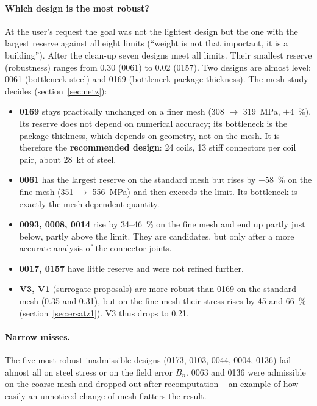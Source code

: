 \paragraph{Which design is the most robust?} At the user's request the goal was not the lightest design but the one
with the largest reserve against all eight limits (``weight is not that important, it is a building''). After the
clean-up seven designs meet all limits. Their smallest reserve (robustness) ranges from 0.30 (0061) to 0.02 (0157).
Two designs are almost level: 0061 (bottleneck steel) and 0169 (bottleneck package thickness). The mesh study
decides (section~\ref{sec:netz}):

\begin{itemize}
\item \textbf{0169} stays practically unchanged on a finer mesh (\SI{308}{} $\to$ \SI{319}{MPa}, $+4$~\%). Its
  reserve does not depend on numerical accuracy; its bottleneck is the package thickness, which depends on
  geometry, not on the mesh. It is therefore the \textbf{recommended design}: 24 coils, 13 stiff connectors per
  coil pair, about \SI{28}{kt} of steel.
\item \textbf{0061} has the largest reserve on the standard mesh but rises by $+58$~\% on the fine mesh
  (\SI{351}{} $\to$ \SI{556}{MPa}) and then exceeds the limit. Its bottleneck is exactly the mesh-dependent
  quantity.
\item \textbf{0093, 0008, 0014} rise by 34--46~\% on the fine mesh and end up partly just below, partly above the
  limit. They are candidates, but only after a more accurate analysis of the connector joints.
\item \textbf{0017, 0157} have little reserve and were not refined further.
\item \textbf{V3, V1} (surrogate proposals) are more robust than 0169 on the standard mesh (0.35 and 0.31), but on
  the fine mesh their stress rises by 45 and 66~\% (section~\ref{sec:ersatz1}). V3 thus drops to 0.21.
\end{itemize}

\paragraph{Narrow misses.} The five most robust inadmissible designs (0173, 0103, 0044, 0004, 0136) fail almost
all on steel stress or on the field error $B_n$. 0063 and 0136 were admissible on the coarse mesh and dropped out
after recomputation -- an example of how easily an unnoticed change of mesh flatters the result.

